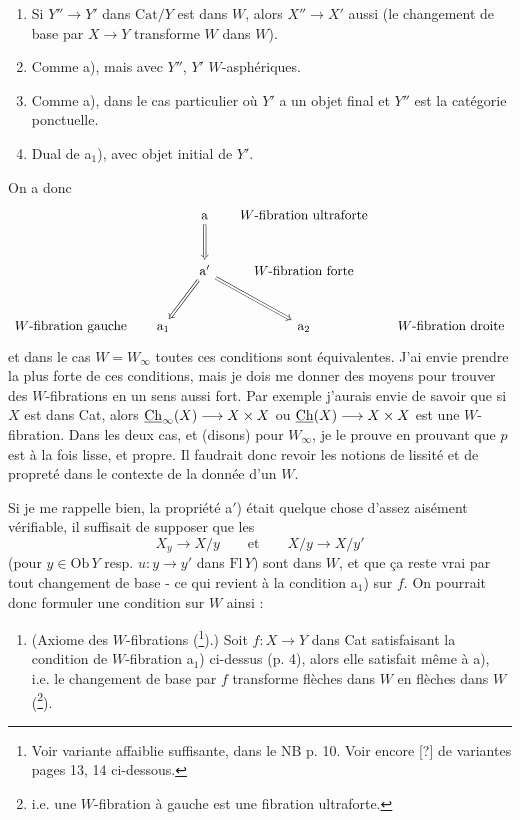 \begin{enumerate}
\item[a)] Si $Y'' \longrightarrow Y'$ dans $\mathrm{Cat}/Y$ est dans $W$, alors $X'' \longrightarrow X'$ aussi (le changement de base par $X \longrightarrow Y$ transforme $W$ dans $W$).
\item[a$'$)] Comme a), mais avec $Y''$, $Y'$ $W$-asphériques.
\item[a$_1$)] Comme a), dans le cas particulier où $Y'$ a un objet final et $Y''$ est la catégorie ponctuelle.
\item[a$_2$)] Dual de a$_1$), avec objet initial de $Y'$.
\end{enumerate}

On a donc
\[
\begin{tikzcd}[row sep=large, column sep=1.4em]
 & & \mathrm{a} \arrow[d, Rightarrow] & \text{$W$-fibration ultraforte} & \\
 & & \mathrm{a}' \arrow[dl, Rightarrow] \arrow[dr, Rightarrow] & \text{$W$-fibration forte} & \\
\text{$W$-fibration gauche} & \mathrm{a}_1 & & \mathrm{a}_2 & \text{$W$-fibration droite}
\end{tikzcd}
\]
et dans le cas $W = W_\infty$ toutes ces conditions sont équivalentes. J'ai envie prendre la plus forte de ces conditions, mais je dois me donner des moyens pour trouver des $W$-fibrations en un sens aussi fort. Par exemple j'aurais envie de savoir que si $X$
est dans Cat, alors $\underline{\mathrm{Ch}}_\infty(X) \longrightarrow X \times X$ ou $\underline{\mathrm{Ch}}(X) \longrightarrow X \times X$ est une $W$-fibration. Dans les deux cas, et (disons) pour $W_\infty$, je le prouve en prouvant que $p$ est à la fois lisse, et propre. Il faudrait donc revoir les notions de lissité et de propreté dans le contexte de la donnée d'un $W$.

Si je me rappelle bien, la propriété a$'$) était quelque chose d'assez aisément vérifiable, il suffisait de supposer que les
\[ X_y \longrightarrow X/y \qquad \text{et} \qquad X/y \longrightarrow X/y' \]
(pour $y \in \mathrm{Ob}\,Y$ resp. $u : y \longrightarrow y'$ dans $\mathrm{Fl}\,Y$) sont dans $W$, et que ça reste vrai par tout changement de base - ce qui revient à la condition a$_1$) sur $f$. On pourrait donc formuler une condition sur $W$ ainsi :

\begin{enumerate}[leftmargin=*]
\item[\textbf{W(4)}] (Axiome des $W$-fibrations (\footnote[6]{Voir variante affaiblie suffisante, dans le NB p. 10. Voir encore [?] de variantes pages 13, 14 ci-dessous.}).) Soit $f : X \longrightarrow Y$ dans Cat satisfaisant la condition de $W$-fibration a$_1$) ci-dessus (p. 4), alors elle satisfait même à a), i.e. le changement de base par $f$ transforme flèches dans $W$ en flèches dans $W$ (\footnote[7]{i.e. une $W$-fibration à gauche est une fibration ultraforte.}).
\end{enumerate}

